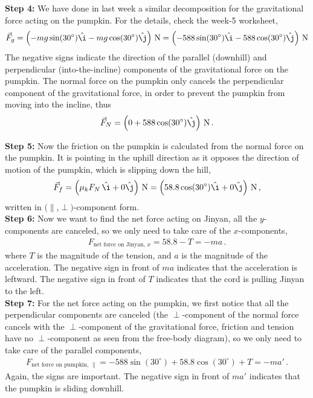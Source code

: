\documentclass[11pt]{article}
\begin{document}
\textbf{Step 4:} We have done in last week a similar decomposition for the gravitational force acting on the pumpkin. For the details, check the week-5 worksheet, 
\begin{align*}
\vec{F}_g = \left( -mg\sin(30^\circ)\hat{\i}-mg\cos(30^\circ)\hat{\j}\right)\,\text{N}= \left( -588\sin(30^\circ)\hat{\i}-588\cos(30^\circ)\hat{\j}\right)\,\text{N}
\end{align*}
The negative signs indicate the direction of the parallel (downhill) and perpendicular (into-the-incline) components of the gravitational force on the pumpkin. The normal force on the pumpkin only cancels the perpendicular component of the gravitational force, in order to prevent the pumpkin from moving into the incline, thus
\begin{align*}
\vec{F}_N =\left( 0+588\cos(30^\circ)\hat{\j}\right)\,\text{N}\,.
\end{align*}

\textbf{Step 5:} Now the friction on the pumpkin is calculated from the normal force on the pumpkin. It is pointing in the uphill direction as it opposes the direction of motion of the pumpkin, which is slipping down the hill, 
\begin{align*}
\vec{F}_f = \left(\mu_k F_N\,\hat{\i} + 0\hat{\j}\right) \,\text{N} = \left( 58.8\cos(30^\circ)\hat{\i}+0\hat{\j}\right) \,\text{N}\,,
\end{align*}
written in $(\parallel$,$\perp)$-component form. \\


\textbf{Step 6:} Now we want to find the net force acting on Jinyan, all the $y$-components are canceled, so we only need to take care of the $x$-components, 
\begin{align*}
F_{\text{net force on Jinyan},\,x} =58.8 -T =-ma\,. 
\end{align*}
where $T$ is the magnitude of the tension, and $a$ is the magnitude of the acceleration. The negative sign in front of $ma$ indicates that the acceleration is leftward. The negative sign in front of $T$ indicates that the cord is pulling Jinyan to the left.\\

\textbf{Step 7:} For the net force acting on the pumpkin, we first notice that all the perpendicular components are canceled (the $\perp$-component of the normal force cancels with the $\perp$-component of the gravitational force, friction and tension have no $\perp$-component as seen from the free-body diagram), so we only need to take care of the parallel components, 
\begin{align*}
F_{\text{net force on pumpkin},\, \parallel} =-588\sin(30^\circ) + 58.8\cos(30^\circ)+T =-ma'\,.
\end{align*}
Again, the signs are important. The negative sign in front of $ma'$ indicates that the pumpkin is sliding downhill.\\
\end{document}
